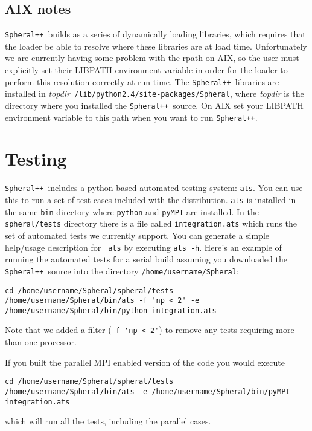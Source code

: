 \documentclass{article}
\newcommand{\Spheral}{{\tt Spheral++}}
\begin{document}
\subsection{AIX notes}
\Spheral\ builds as a series of dynamically loading libraries, which requires
that the loader be able to resolve where these libraries are at load time.
Unfortunately we are currently having some problem with the rpath on AIX, so the
user must explicitly set their LIBPATH environment variable in order for the
loader to perform this resolution correctly at run time.  The
\Spheral\ libraries are installed in {\em topdir}{\tt
  /lib/python2.4/site-packages/Spheral}, where {\em topdir} is the directory
where you installed the \Spheral\ source.  On AIX set your LIBPATH environment
variable to this path when you want to run \Spheral.

\section{Testing}
\Spheral\ includes a python based automated testing system: \verb+ats+.  You
can use this to run a set of test cases included with the distribution.
\verb+ats+ is installed in the same \verb+bin+ directory where \verb+python+
and \verb+pyMPI+ are installed.  In the \verb+spheral/tests+ directory there is
a file called \verb+integration.ats+ which runs the set of automated tests we
currently support.  You can generate a simple help/usage description for {\tt
  ats} by executing \verb+ats -h+.  Here's an example of running the automated
tests for a serial build assuming you downloaded the \Spheral\ source into the
directory \verb+/home/username/Spheral+:
\begin{verbatim}
cd /home/username/Spheral/spheral/tests
/home/username/Spheral/bin/ats -f 'np < 2' -e /home/username/Spheral/bin/python integration.ats
\end{verbatim}
Note that we added a filter (\verb+-f 'np < 2'+) to remove any tests requiring
more than one processor.

If you built the parallel MPI enabled version of the code you would execute
\begin{verbatim}
cd /home/username/Spheral/spheral/tests
/home/username/Spheral/bin/ats -e /home/username/Spheral/bin/pyMPI integration.ats
\end{verbatim}
which will run all the tests, including the parallel cases.

\appendix
\end{document}
